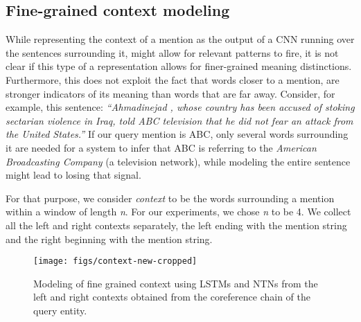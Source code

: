 \documentclass[letterpaper]{article} \usepackage{aaai18}  \usepackage{times}  \usepackage{helvet}  \usepackage{courier}  \usepackage{url}  \usepackage{graphicx}  \frenchspacing  \setlength{\pdfpagewidth}{8.5in}  \setlength{\pdfpageheight}{11in}  \usepackage{latexsym}
\begin{document}
\subsection{Fine-grained context modeling}
\label{context-repr}
While representing the context of a mention as the output of a CNN running over the sentences surrounding it, might allow for relevant patterns to fire, it is not clear if this type of a representation allows for finer-grained meaning distinctions. Furthermore, this does not exploit the fact that words closer to a mention, are stronger indicators of its meaning than words that are far away. Consider, for example, this sentence: \textit{``Ahmadinejad , whose country has been accused of stoking sectarian violence in Iraq, told ABC television that he did not fear an attack from the United States.''} If our query mention is ABC, only several words surrounding it are needed for a system to infer that ABC is referring to the \textit{American Broadcasting Company} (a television network), while modeling the entire sentence might lead to losing that signal.

For that purpose, we consider \textit{context} to be the words surrounding a mention within a window of length \textit{n}. For our experiments, we chose \textit{n} to be 4. We collect all the left and right contexts separately, the left ending with the mention string and the right beginning with the mention string.
\begin{figure*}
\begin{center}
\texttt{[image: figs/context-new-cropped]}
\end{center}
\caption{Modeling of fine grained context using LSTMs and NTNs from the left and right contexts obtained from the coreference chain of the query entity.}
\label{fig:lstms}
\end{figure*}
\end{document}
